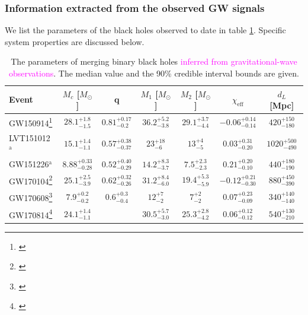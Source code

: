 \documentclass[iop,onecolumn]{revtex4}
\newcommand{\ilya}[1]{\textcolor{magenta}{#1}}
\begin{document}
\subsubsection{Information extracted from the observed GW signals}
We list the parameters of the black holes observed to date in table \ref{table:BHmasses}. Specific system properties are discussed below.

\begin{table}
\begin{tabular}{lcccccc}
Event  & $M_c$ [$M_\odot$]  & q & $M_1$ [$M_\odot$]  & $M_2$ [$M_\odot$]  & $\chi_\textrm{eff}$ & $d_L$ [Mpc] \\
\hline
GW150914\footnote{\citet{BBH:O1}} & $28.1^{+1.8}_{-1.5}$ & $0.81^{+0.17}_{-0.2}$ & $36.2^{+5.2}_{-3.8}$ & $29.1^{+3.7}_{-4.4}$ & $-0.06^{+0.14}_{-0.14}$ & $420^{+150}_{-180}$\\
LVT151012$^\mathrm{a}$ & $15.1^{+1.4}_{-1.1}$ &$0.57^{+0.38}_{-0.37}$ &$23^{+18}_{-6}$ &$13^{+4}_{-5}$ &$0.03^{+0.31}_{-0.20}$ &$1020^{+500}_{-490}$\\
GW151226$^\mathrm{a}$ & $8.88^{+0.33}_{-0.28}$ &$0.52^{+0.40}_{-0.29}$ &$14.2^{+8.3}_{-3.7}$ &$7.5^{+2.3}_{-2.3}$ &$0.21^{+0.20}_{-0.10}$ &$440^{+180}_{-190}$ \\
GW170104\footnote{\citet{GW170104}} & $25.1^{+2.5}_{-3.9}$ &$0.62^{+0.32}_{-0.26}$ &$31.2^{+8.4}_{-6.0}$ &$19.4^{+5.3}_{-5.9}$ &$-0.12^{+0.21}_{-0.30}$ &$880^{+450}_{-390}$\\
GW170608\footnote{\citet{GW170608}} & $7.9^{+0.2}_{-0.2}$ &$0.6^{+0.3}_{-0.4}$ &$12^{+7}_{-2}$ &$7^{+2}_{-2}$ &$0.07^{+0.23}_{-0.09}$ &$340^{+140}_{-140}$ \\
GW170814\footnote{\citet{GW170814}} & $24.1^{+1.4}_{-1.1}$ & &$30.5^{+5.7}_{-3.0}$ &$25.3^{+2.8}_{-4.2}$ &$0.06^{+0.12}_{-0.12}$ & $540^{+130}_{-210}$ \\
\hline
\end{tabular}
\caption{The parameters of merging binary black holes \ilya{inferred from gravitational-wave observations}.  The median value and the 90\% credible interval bounds are given.}\label{table:BHmasses}
\end{table}
\end{document}
